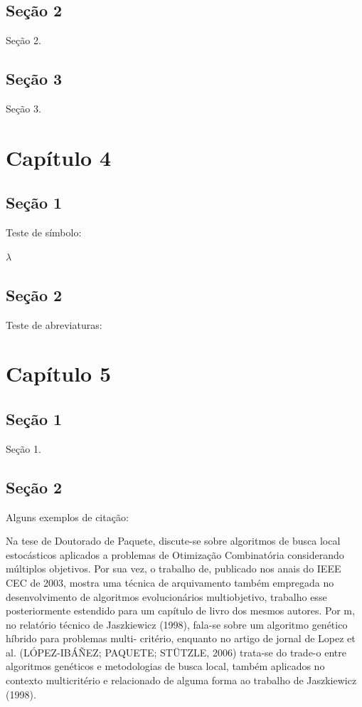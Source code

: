\documentclass[
	12pt,				%
	openright,			%
	oneside,	
	a4paper,				%
	english,				%
	brazil				%
]{abntex2/abntex2} %
\begin{document}
	\section{Seção 2}
	
		Seção 2.

	\section{Seção 3}
	
		Seção 3.
		
\chapter{Capítulo 4}

	\section{Seção 1}
	
		Teste de símbolo:
		
		$\lambda$
		
	\section{Seção 2}
	
		Teste de abreviaturas:
		
\chapter{Capítulo 5}

	\section{Seção 1}
	
		Seção 1.
	
	\section{Seção 2}
	
		Alguns exemplos de citação:

		Na tese de Doutorado de Paquete, discute-se sobre algoritmos de busca local estocásticos aplicados a problemas de Otimização Combinatória considerando múltiplos objetivos. Por sua vez, o trabalho de, publicado nos anais do IEEE CEC de 2003, mostra uma técnica de arquivamento também empregada no desenvolvimento de algoritmos evolucionários multiobjetivo, trabalho esse posteriormente estendido para um capítulo de livro dos mesmos autores. Por m, no relatório técnico de Jaszkiewicz (1998), fala-se sobre um algoritmo genético híbrido para problemas multi- critério, enquanto no artigo de jornal de Lopez et al. (LÓPEZ-IBÁÑEZ; PAQUETE; STÜTZLE, 2006) trata-se do trade-o entre algoritmos genéticos e metodologias de busca local, também aplicados no contexto multicritério e relacionado de alguma forma ao trabalho de Jaszkiewicz (1998).
\end{document}
